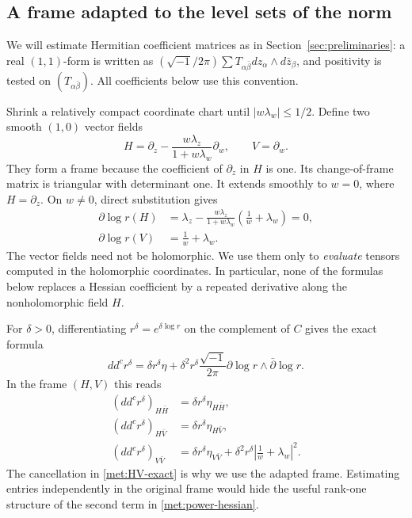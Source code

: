 \documentclass[11pt,a4paper]{article}
\numberwithin{equation}{section}
\theoremstyle{definition}
\theoremstyle{remark}
\newcommand{\ddc}{dd^{c}}
\begin{document}
\subsection{A frame adapted to the level sets of the norm}

We will estimate Hermitian coefficient matrices as in
Section~\ref{sec:preliminaries}: a real $(1,1)$-form is written as
$(\sqrt{-1}/2\pi)\sum T_{\alpha\bar\beta}
 dz_\alpha\wedge d\bar z_\beta$, and positivity is tested on
$(T_{\alpha\bar\beta})$. All coefficients below use this convention.

Shrink a relatively compact coordinate chart until
$|w\lambda_w|\le1/2$. Define two smooth $(1,0)$ vector fields
\begin{equation}\label{met:adapted-frame}
 H=\partial_z-\frac{w\lambda_z}{1+w\lambda_w}\partial_w,
 \qquad V=\partial_w.
\end{equation}
They form a frame because the coefficient of $\partial_z$ in $H$ is
one. Its change-of-frame matrix is triangular with determinant one.
It extends smoothly to $w=0$, where $H=\partial_z$.
On $w\ne0$, direct substitution gives
\begin{align}
 \partial\log r(H)
 &=\lambda_z-
   \frac{w\lambda_z}{1+w\lambda_w}
                    \left(\frac1w+\lambda_w\right)=0,
                    \label{met:H-log}\\
 \partial\log r(V)&=\frac1w+\lambda_w.
                    \label{met:V-log}
\end{align}
The vector fields need not be holomorphic. We use them only to
\emph{evaluate} tensors computed in the holomorphic coordinates.
In particular, none of the formulas below replaces a Hessian coefficient
by a repeated derivative along the nonholomorphic field $H$.

For $\delta>0$, differentiating $r^\delta=e^{\delta\log r}$ on the
complement of $C$ gives the exact formula
\begin{equation}\label{met:power-hessian}
 \ddc r^\delta
   =\delta r^\delta\eta+
     \delta^2r^\delta\frac{\sqrt{-1}}{2\pi}
                     \partial\log r\wedge\bar\partial\log r.
\end{equation}
In the frame $(H,V)$ this reads
\begin{align}
 (\ddc r^\delta)_{H\bar H}
      &=\delta r^\delta\eta_{H\bar H},\label{met:HH-exact}\\
 (\ddc r^\delta)_{H\bar V}
      &=\delta r^\delta\eta_{H\bar V},\label{met:HV-exact}\\
 (\ddc r^\delta)_{V\bar V}
      &=\delta r^\delta\eta_{V\bar V}
       +\delta^2r^\delta\left|\frac1w+\lambda_w\right|^2.
          \label{met:VV-exact}
\end{align}
The cancellation in \eqref{met:HV-exact} is why we use the adapted
frame. Estimating entries independently in the original frame would
hide the useful rank-one structure of the second term in
\eqref{met:power-hessian}.
\end{document}
